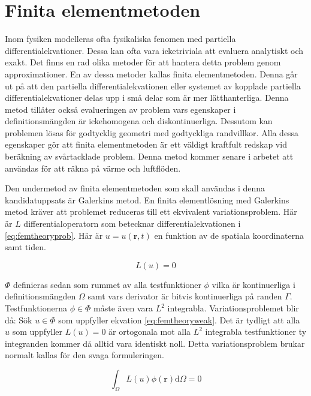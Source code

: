 \section{Finita elementmetoden}

Inom fysiken modelleras ofta fysikaliska fenomen med partiella differentialekvationer.
Dessa kan ofta vara icketriviala att evaluera analytiskt och exakt. Det finns en
rad olika metoder för att hantera detta problem genom approximationer. En av
dessa metoder kallas finita elementmetoden. Denna går ut på att den
partiella differentialekvationen eller systemet av kopplade partiella
differentialekvationer delas upp i små delar som är mer lätthanterliga.
Denna metod tillåter också evalueringen av problem vars egenskaper i
definitionsmängden är ickehomogena och diskontinuerliga. Dessutom kan
problemen lösas för godtycklig geometri med godtyckliga randvillkor. Alla
dessa egenskaper gör att finita elementmetoden är ett väldigt kraftfult redskap
vid beräkning av svårtacklade problem. Denna metod kommer senare i arbetet
att användas för att räkna på värme och luftflöden.

Den undermetod av finita elementmetoden som skall användas i denna
kandidatuppsats är Galerkins metod.
En finita elementlösning med Galerkins metod kräver att problemet reduceras till
ett ekvivalent variationsproblem.
Här är $L$ differentialoperatorn
som betecknar differentialekvationen i \eqref{eq:femtheoryprob}.
Här är $u = u(\mathbf{r},t)$ en funktion av de spatiala koordinaterna samt tiden.

\begin{equation}
\label{eq:femtheoryprob}
L(u) = 0
\end{equation}

\noindent
$\Phi$ definieras sedan som rummet av alla testfunktioner $\phi$ vilka
 är kontinuerliga i
definitionsmängden $\Omega$ samt vars derivator är bitvis kontinuerliga på randen
$\Gamma$. Testfunktionerna $\phi \in \Phi$ måste även vara $L^2$ integrabla.
Variationsproblemet blir då: Sök $u\in\Phi$
som uppfyller ekvation \eqref{eq:femtheoryweak}. Det är tydligt
att alla $u$ som uppfyller $L(u) = 0$ är ortogonala mot alla
$L^2$ integrabla testfunktioner ty integranden kommer då alltid vara identiskt noll.
Detta variationsproblem brukar normalt kallas för den svaga formuleringen.

\begin{equation}
\label{eq:femtheoryweak}
\int_\Omega L(u)\phi(\mathbf{r}) \mathrm{d}\Omega = 0
\end{equation}

